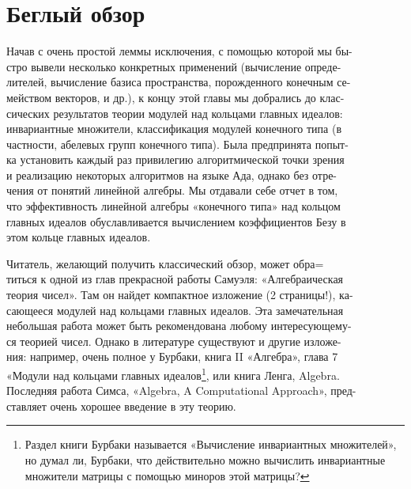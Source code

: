 \documentclass{../template/mai_book}
\begin{document}
\pagebreak

\sectiontop
\section{Беглый обзор} 

\medskip

\noindent  Начав с очень простой леммы исключения, с помощью которой мы 
бы-\\стро вывели несколько конкретных применений (вычисление 
опреде-\\лителей, вычисление базиса пространства, порожденного конечным 
се-\\мейством векторов, и др.), к концу этой главы мы добрались до 
клас-\\сических результатов теории модулей над кольцами главных идеалов: \\
инвариантные множители, классификация модулей конечного типа (в\\ 
частности, абелевых групп конечного типа). Была предпринята 
попыт-\\ка установить каждый раз привилегию алгоритмической точки зрения\\ 
и реализацию некоторых алгоритмов на языке Ада, однако без 
отре-\\чения от понятий линейной алгебры. Мы отдавали себе отчет в том,\\
что эффективность линейной алгебры «конечного типа» над кольцом\\ 
главных идеалов обуславливается вычислением коэффициентов Безу в\\ 
этом кольце главных идеалов. 


Читатель, желающий получить классический обзор, может 
обра=\\титься к одной из глав прекрасной работы Самуэля: «Алгебраическая\\ 
теория чисел». Там он найдет компактное изложение (2 страницы!), 
ка-\\сающееся модулей над кольцами главных идеалов. Эта замечательная\\
небольшая работа может быть рекомендована любому 
интересующему-\\ся теорией чисел. Однако в литературе существуют и другие
изложе-\\ния: например, очень полное у Бурбаки, книга II «Алгебра», глава 7\\ 
«Модули над кольцами главных идеалов\footnote{Раздел книги Бурбаки называется «Вычисление инвариантных множителей», но 
думал ли, Бурбаки, что действительно можно вычислить инвариантные множители матрицы с помощью миноров этой матрицы? }, или книга Ленга, Algebra.\\ 
Последняя работа Симса, «Algebra, A Computational Approach», 
пред-\\ставляет очень хорошее введение в эту теорию. 
\end{document}
